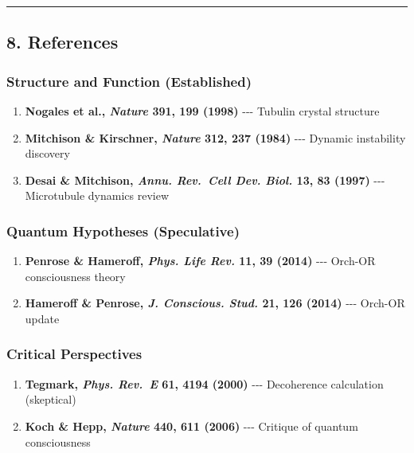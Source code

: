 \begin{center}\rule{0.5\linewidth}{0.5pt}\end{center}

\subsection{8. References}\label{references}

\subsubsection{Structure and Function
(Established)}\label{structure-and-function-established}

\begin{enumerate}
\def\labelenumi{\arabic{enumi}.}
\tightlist
\item
  \textbf{Nogales et al., \emph{Nature} 391, 199 (1998)} -\/-\/- Tubulin
  crystal structure
\item
  \textbf{Mitchison \& Kirschner, \emph{Nature} 312, 237 (1984)} -\/-\/-
  Dynamic instability discovery
\item
  \textbf{Desai \& Mitchison, \emph{Annu. Rev.~Cell Dev. Biol.} 13, 83
  (1997)} -\/-\/- Microtubule dynamics review
\end{enumerate}

\subsubsection{Quantum Hypotheses
(Speculative)}\label{quantum-hypotheses-speculative}

\begin{enumerate}
\def\labelenumi{\arabic{enumi}.}
\setcounter{enumi}{3}
\tightlist
\item
  \textbf{Penrose \& Hameroff, \emph{Phys. Life Rev.} 11, 39 (2014)}
  -\/-\/- Orch-OR consciousness theory
\item
  \textbf{Hameroff \& Penrose, \emph{J. Conscious. Stud.} 21, 126
  (2014)} -\/-\/- Orch-OR update
\end{enumerate}

\subsubsection{Critical Perspectives}\label{critical-perspectives}

\begin{enumerate}
\def\labelenumi{\arabic{enumi}.}
\setcounter{enumi}{5}
\tightlist
\item
  \textbf{Tegmark, \emph{Phys. Rev.~E} 61, 4194 (2000)} -\/-\/-
  Decoherence calculation (skeptical)
\item
  \textbf{Koch \& Hepp, \emph{Nature} 440, 611 (2006)} -\/-\/- Critique
  of quantum consciousness
\end{enumerate}

